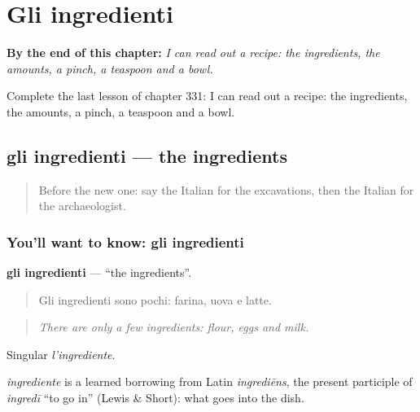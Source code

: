 
\chapter{Gli ingredienti}
\label{ch:it-gli-ingredienti}

\begin{chapteropening}
\textbf{By the end of this chapter:} \emph{I can read out a recipe: the ingredients, the amounts, a pinch, a teaspoon and a bowl.}

Complete the last lesson of chapter 331: I can read out a recipe: the ingredients, the amounts, a pinch, a teaspoon and a bowl.
\end{chapteropening}

\section[gli ingredienti]{gli ingredienti — the ingredients}

\label{lesson:IT-C331-ingredienti}



\begin{quote}
Before the new one: say the Italian for the excavations, then the Italian for the archaeologist.
\end{quote}

\subsection*{You'll want to know: gli ingredienti}
\textbf{gli ingredienti} — \textquotedblleft{}the ingredients\textquotedblright{}.

\begin{quote}
Gli ingredienti sono pochi: farina, uova e latte.
\end{quote}

\begin{quote}
\emph{There are only a few ingredients: flour, eggs and milk.}
\end{quote}

Singular \emph{l'ingrediente}.

\begin{cousinweb}
\emph{ingrediente} is a learned borrowing from Latin \emph{ingrediēns}, the present participle of \emph{ingredī} \textquotedblleft{}to go in\textquotedblright{} (Lewis \& Short): what goes into the dish.
\end{cousinweb}

